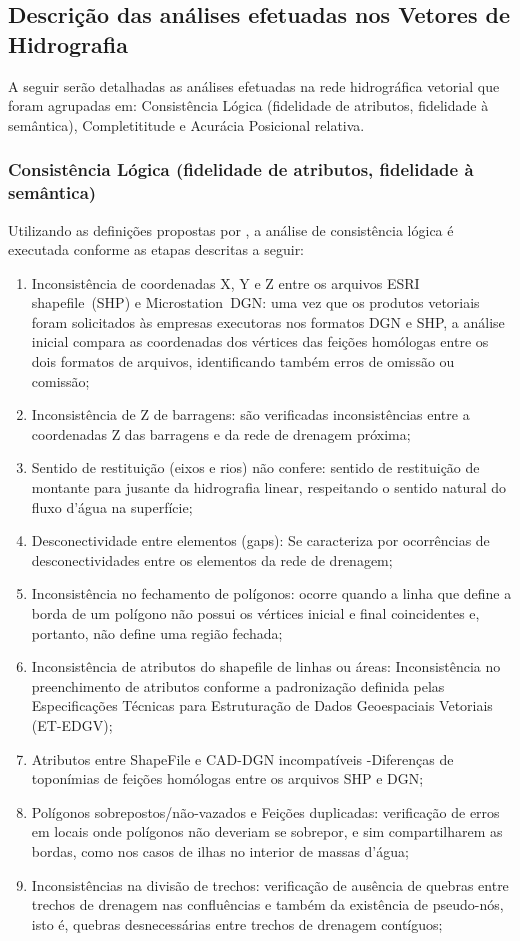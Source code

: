 \documentclass[12pt,a4paper]{article}
\begin{document}
		\subsection{Descrição das análises efetuadas nos Vetores de Hidrografia}
		A seguir serão detalhadas as análises efetuadas na rede hidrográfica vetorial que foram agrupadas em: Consistência Lógica (fidelidade de atributos, fidelidade à semântica), Completititude e Acurácia Posicional relativa.
		\subsubsection{Consistência Lógica (fidelidade de atributos, fidelidade à semântica)}
		
		Utilizando as definições propostas por , a análise de consistência lógica é executada conforme as etapas descritas a seguir:
		\begin{enumerate}
			\item Inconsistência de coordenadas X, Y e Z entre os arquivos ESRI shapefile\textregistered\ (SHP) e Microstation\textregistered\ DGN: uma vez que os produtos vetoriais foram solicitados às empresas executoras nos formatos DGN e SHP, a análise inicial compara as coordenadas dos vértices das feições homólogas entre os dois formatos de arquivos, identificando também erros de omissão ou comissão;
			\item Inconsistência de Z de barragens: são verificadas inconsistências entre a coordenadas Z das barragens e da rede de drenagem próxima;
			\item Sentido de restituição (eixos e rios) não confere: sentido de restituição de montante para jusante da hidrografia linear, respeitando o sentido natural do fluxo d'água na superfície;
			\item Desconectividade entre elementos (gaps): Se caracteriza por ocorrências de desconectividades entre os elementos da rede de drenagem;
			\item Inconsistência no fechamento de polígonos: ocorre quando a linha que define a borda de um polígono não possui os vértices inicial e final coincidentes e, portanto, não define uma região fechada;
			\item Inconsistência de atributos do shapefile de linhas ou áreas: Inconsistência no preenchimento de atributos conforme a padronização definida pelas Especificações Técnicas para Estruturação de Dados Geoespaciais Vetoriais (ET-EDGV);
			\item Atributos entre ShapeFile e CAD-DGN incompatíveis -Diferenças de toponímias de feições homólogas entre os arquivos SHP e DGN;
			\item Polígonos sobrepostos/não-vazados e Feições duplicadas: verificação de erros em locais onde polígonos não deveriam se sobrepor, e sim compartilharem as bordas, como nos casos de ilhas no interior de massas d'água;
			\item Inconsistências na divisão de trechos: verificação de ausência de quebras entre trechos de drenagem nas confluências e também da existência de pseudo-nós, isto é, quebras desnecessárias entre trechos de drenagem contíguos;
		\end{enumerate}
		
\end{document}
